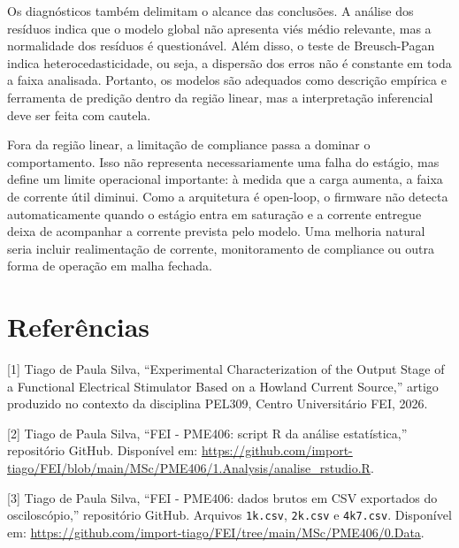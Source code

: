 \documentclass[
  brazilian,
]{article}
\renewcommand{\_}{\oldunderscore\discretionary{}{}{}}
\begin{document}
Os diagnósticos também delimitam o alcance das conclusões. A análise dos
resíduos indica que o modelo global não apresenta viés médio relevante,
mas a normalidade dos resíduos é questionável. Além disso, o teste de
Breusch-Pagan indica heterocedasticidade, ou seja, a dispersão dos erros
não é constante em toda a faixa analisada. Portanto, os modelos são
adequados como descrição empírica e ferramenta de predição dentro da
região linear, mas a interpretação inferencial deve ser feita com cautela.

Fora da região linear, a limitação de compliance passa a dominar o
comportamento. Isso não representa necessariamente uma falha do estágio,
mas define um limite operacional importante: à medida que a carga aumenta,
a faixa de corrente útil diminui. Como a arquitetura é open-loop, o
firmware não detecta automaticamente quando o estágio entra em saturação e
a corrente entregue deixa de acompanhar a corrente prevista pelo modelo.
Uma melhoria natural seria incluir realimentação de corrente, monitoramento
de compliance ou outra forma de operação em malha fechada.

\clearpage

\section*{Referências}\label{referuxeancias}

{[}1{]} Tiago de Paula Silva, ``Experimental Characterization of the
Output Stage of a Functional Electrical Stimulator Based on a Howland
Current Source,'' artigo produzido no contexto da disciplina PEL309,
Centro Universitário FEI, 2026.

{[}2{]} Tiago de Paula Silva, ``FEI - PME406: script R da análise
estatística,'' repositório GitHub. Disponível em:
\url{https://github.com/import-tiago/FEI/blob/main/MSc/PME406/1.Analysis/analise_rstudio.R}.

{[}3{]} Tiago de Paula Silva, ``FEI - PME406: dados brutos em CSV
exportados do osciloscópio,'' repositório GitHub. Arquivos
\texttt{1k.csv}, \texttt{2k.csv} e \texttt{4k7.csv}. Disponível em:
\url{https://github.com/import-tiago/FEI/tree/main/MSc/PME406/0.Data}.
\end{document}
